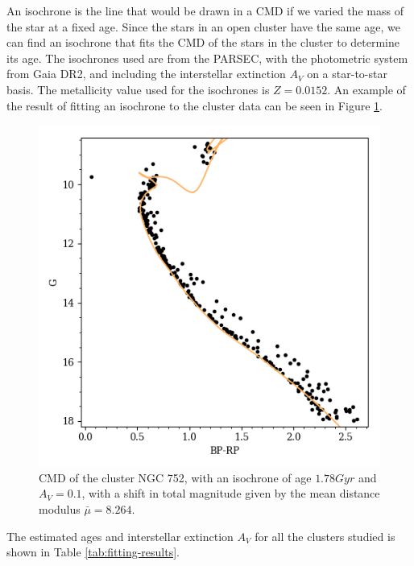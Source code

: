 \documentclass[twocolumn]{revtex4}
\begin{document}
An isochrone is the line that would be drawn in a CMD if we varied the mass of the star at a fixed age. Since the stars in an open cluster have the same age, we can find an isochrone that fits the CMD of the stars in the cluster to determine its age.
The isochrones used are from the PARSEC\cite{parsec}, with the photometric system from Gaia DR2\cite{gaiadr2}, and including the interstellar extinction $A_V$ on a star-to-star basis\cite{girardi}. The metallicity value used for the isochrones is $Z = 0.0152$.  An example of the result of fitting an isochrone to the cluster data can be seen in Figure \ref{nice-isochrone}.

\begin{figure}[h!]
\centering
\includegraphics[scale=0.65]{NGC_752}
\caption{CMD of the cluster NGC 752, with an isochrone of age $1.78 \si{Gyr}$ and $A_V = 0.1$, with a shift in total magnitude given by the mean distance modulus $\bar{\mu} = 8.264$.}
\label{nice-isochrone}
\end{figure}

The estimated ages and interstellar extinction $A_V$ for all the clusters studied is shown in Table \ref{tab:fitting-results}.
\end{document}
